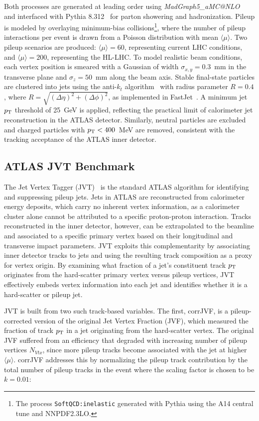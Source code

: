 Both processes are generated at leading order using \textit{MadGraph5\_aMC@NLO}~\cite{madgraph} and interfaced with Pythia 8.312~\cite{pythia} for parton showering and hadronization. 
Pileup is modeled by overlaying minimum-bias collisions\footnote{The process \texttt{SoftQCD:inelastic} generated with Pythia using the A14 central tune and NNPDF2.3LO.}, where the number of pileup interactions per event is drawn from a Poisson distribution with mean $\langle\mu\rangle$. 
Two pileup scenarios are produced: $\langle\mu\rangle=60$, representing current LHC conditions, and $\langle\mu\rangle=200$, representing the HL-LHC. 
To model realistic beam conditions, each vertex position is smeared with a Gaussian of width $\sigma_{x,y}=0.3$~mm in the transverse plane and $\sigma_z=50$~mm along the beam axis. 
Stable final-state particles are clustered into jets using the anti-$k_t$ algorithm~\cite{Cacciari_2008} with radius parameter $R=0.4$, where $R = \sqrt{(\Delta\eta)^2+(\Delta\phi)^2}$, as implemented in FastJet~\cite{fastjet}. 
A minimum jet $p_{\rm T}$ threshold of 25~GeV is applied, reflecting the practical limit of calorimeter jet reconstruction in the ATLAS detector. 
Similarly, neutral particles are excluded and charged particles with $p_{\rm T} < 400$~MeV are removed, consistent with the tracking acceptance of the ATLAS inner detector.
 
\subsection{ATLAS JVT Benchmark}

The Jet Vertex Tagger (JVT)~\cite{JVT} is the standard ATLAS algorithm for identifying and suppressing pileup jets. 
Jets in ATLAS are reconstructed from calorimeter energy deposits, which carry no inherent vertex information, as a calorimeter cluster alone cannot be attributed to a specific proton-proton interaction. 
Tracks reconstructed in the inner detector, however, can be extrapolated to the beamline and associated to a specific primary vertex based on their longitudinal and transverse impact parameters. 
JVT exploits this complementarity by associating inner detector tracks to jets and using the resulting track composition as a proxy for vertex origin. 
By examining what fraction of a jet's constituent track $p_{\rm T}$ originates from the hard-scatter primary vertex versus pileup vertices, JVT effectively embeds vertex information into each jet and identifies whether it is a hard-scatter or pileup jet.

JVT is built from two such track-based variables. 
The first, corrJVF, is a pileup-corrected version of the original Jet Vertex Fraction (JVF), which measured the fraction of track $p_{\rm T}$ in a jet originating from the hard-scatter vertex. 
The original JVF suffered from an efficiency that degraded with increasing number of pileup vertices $N_{Vtx}$, since more pileup tracks become associated with the jet at higher $\langle\mu\rangle$. 
corrJVF addresses this by normalizing the pileup track contribution by the total number of pileup tracks in the event where the scaling factor is chosen to be $k=0.01$:

